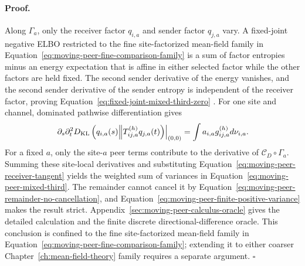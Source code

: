 \paragraph{Proof.}
Along \(\Gamma_a\), only the receiver factor \(q_{i,a}\) and sender factor \(q_{j,a}\) vary. A fixed-joint negative ELBO restricted to the fine site-factorized mean-field family in Equation~\eqref{eq:moving-peer-fine-comparison-family} is a sum of factor entropies minus an energy expectation that is affine in either selected factor while the other factors are held fixed. The second sender derivative of the energy vanishes, and the second sender derivative of the sender entropy is independent of the receiver factor, proving Equation~\eqref{eq:fixed-joint-mixed-third-zero} \citep{Wainwright2008}. For one site and channel, dominated pathwise differentiation gives
\begin{equation}
\left.\partial_s\partial_t^2
D_{\mathrm{KL}}\left(q_{i,a}(s)\middle\Vert
T_{ij,a}^{(h)}q_{j,a}(t)\right)\right|_{(0,0)}
=\int a_{i,a}g_{ij,a}^{(h)}d\nu_{i,a}.
\label{eq:moving-peer-derivative-calculation}
\end{equation}
For a fixed \(a\), only the site-\(a\) peer terms contribute to the derivative of \(\mathcal C_D\circ\Gamma_a\). Summing these site-local derivatives and substituting Equation~\eqref{eq:moving-peer-receiver-tangent} yields the weighted sum of variances in Equation~\eqref{eq:moving-peer-mixed-third}. The remainder cannot cancel it by Equation~\eqref{eq:moving-peer-remainder-no-cancellation}, and Equation~\eqref{eq:moving-peer-finite-positive-variance} makes the result strict. Appendix~\ref{sec:moving-peer-calculus-oracle} gives the detailed calculation and the finite discrete directional-difference oracle. This conclusion is confined to the fine site-factorized mean-field family in Equation~\eqref{eq:moving-peer-fine-comparison-family}; extending it to either coarser Chapter~\ref{ch:mean-field-theory} family requires a separate argument. \(\square\)

